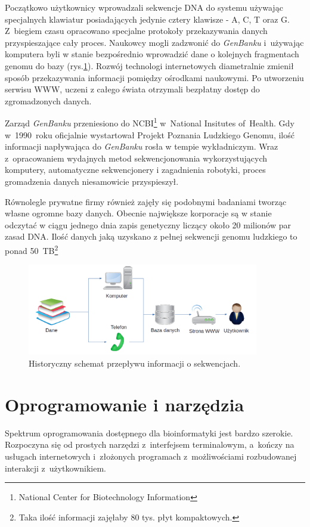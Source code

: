 \documentclass[a4paper,12pt,oneside]{mwrep}  %
\begin{document}
Początkowo użytkownicy wprowadzali sekwencje DNA do systemu używając specjalnych klawiatur posiadających jedynie cztery klawisze - A, C, T oraz G. Z~biegiem czasu opracowano specjalne protokoły przekazywania danych przyspieszające cały proces. Naukowcy mogli zadzwonić do \emph{GenBanku} i~używając komputera byli w stanie bezpośrednio wprowadzić dane o kolejnych fragmentach genomu do bazy (rys.\ref{historia-przeplywu-danych-sekwencji}). Rozwój technologi internetowych diametralnie zmienił sposób przekazywania informacji pomiędzy ośrodkami naukowymi. Po utworzeniu serwisu WWW, uczeni z całego świata otrzymali bezpłatny dostęp do zgromadzonych danych.

Zarząd \emph{GenBanku} przeniesiono do NCBI\footnote{National Center for Biotechnology Information} w~National Insitutes of~Health. Gdy w~1990~roku oficjalnie wystartował Projekt Poznania Ludzkiego Genomu, ilość informacji napływająca do \emph{GenBanku} rosła w tempie wykładniczym. Wraz z~opracowaniem wydajnych metod sekwencjonowania wykorzystujących komputery, automatyczne sekwencjonery i zagadnienia robotyki, proces gromadzenia danych niesamowicie przyspieszył.

Równolegle prywatne firmy również zajęły się podobnymi badaniami tworząc własne ogromne bazy danych. Obecnie największe korporacje są w stanie odczytać w ciągu jednego dnia zapis genetyczny liczący około 20 milionów par zasad DNA. Ilość danych jaką uzyskano z pełnej sekwencji genomu ludzkiego to ponad 50~TB\footnote{Taka ilość informacji zajęłaby 80 tys. płyt kompaktowych.}
\begin{figure}[!h]
\centering
\includegraphics[width=0.9\textwidth]{grafika/historia.png}
\caption{Historyczny schemat przepływu informacji o sekwencjach.}
\label{historia-przeplywu-danych-sekwencji}
\end{figure}

\section{Oprogramowanie i narzędzia}
Spektrum oprogramowania dostępnego dla bioinformatyki jest bardzo szerokie. Rozpoczyna się od prostych narzędzi z~interfejsem terminalowym, a~kończy na usługach internetowych i~złożonych programach z~możliwościami rozbudowanej interakcji z~użytkownikiem.
\end{document}
